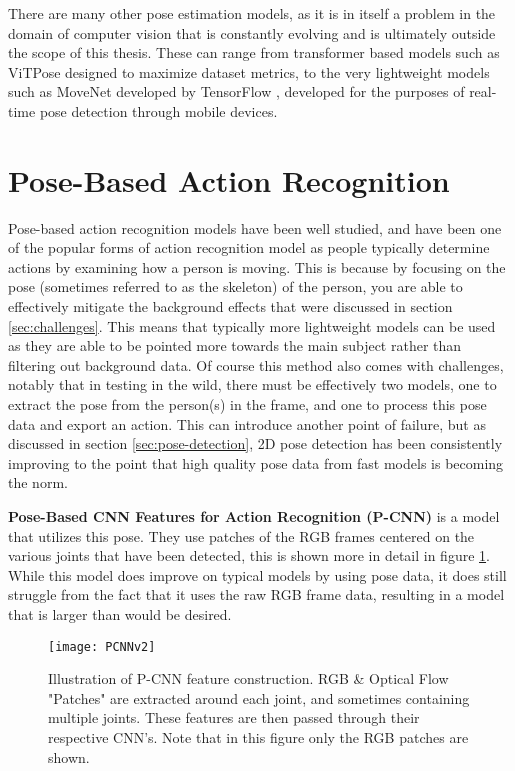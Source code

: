 There are many other pose estimation models, as it is in itself a problem in the domain of computer vision that is constantly evolving and is ultimately outside the scope of this thesis. These can range from transformer based models such as ViTPose \cite{vitpose} designed to maximize dataset metrics, to the very lightweight models such as MoveNet developed by TensorFlow \cite{tensorflow2015-whitepaper}, developed for the purposes of real-time pose detection through mobile devices.

\section{Pose-Based Action Recognition}
\label{sec:pose-based}

Pose-based action recognition models have been well studied, and have been one of the popular forms of action recognition model as people typically determine actions by examining how a person is moving. This is because by focusing on the pose (sometimes referred to as the skeleton) of the person, you are able to effectively mitigate the background effects that were discussed in section \ref{sec:challenges}. This means that typically more lightweight models can be used as they are able to be pointed more towards the main subject rather than filtering out background data. Of course this method also comes with challenges, notably that in testing in the wild, there must be effectively two models, one to extract the pose from the person(s) in the frame, and one to process this pose data and export an action. This can introduce another point of failure, but as discussed in section \ref{sec:pose-detection}, 2D pose detection has been consistently improving to the point that high quality pose data from fast models is becoming the norm.

\textbf{Pose-Based CNN Features for Action Recognition (P-CNN)} \cite{PCNN} is a model that utilizes this pose. They use patches of the RGB frames centered on the various joints that have been detected, this is shown more in detail in figure \ref{fig:pcnn}. While this model does improve on typical models by using pose data, it does still struggle from the fact that it uses the raw RGB frame data, resulting in a model that is larger than would be desired.

\begin{figure}[ht]
	\texttt{[image: PCNNv2]}
	\centering
	\caption{Illustration of P-CNN \cite{PCNN} feature construction. RGB \& Optical Flow "Patches" are extracted around each joint, and sometimes containing multiple joints. These features are then passed through their respective CNN's. Note that in this figure only the RGB patches are shown.}
	\label{fig:pcnn}
\end{figure}

